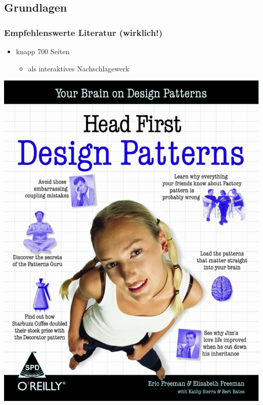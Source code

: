 \documentclass[18pt]{beamer}
\begin{document}
	\subsection{Grundlagen}
	\begin{frame}
		\frametitle{Empfehlenswerte Literatur (wirklich!)}
		\begin{itemize}
			\item knapp 700 Seiten
			\begin{itemize}
				\item als interaktives Nachschlagewerk
			\end{itemize}
		\end{itemize}
		\centering
		\includegraphics[scale=0.15]{./pics/tut3/literature.jpg}
	\end{frame}
		
\end{document}

